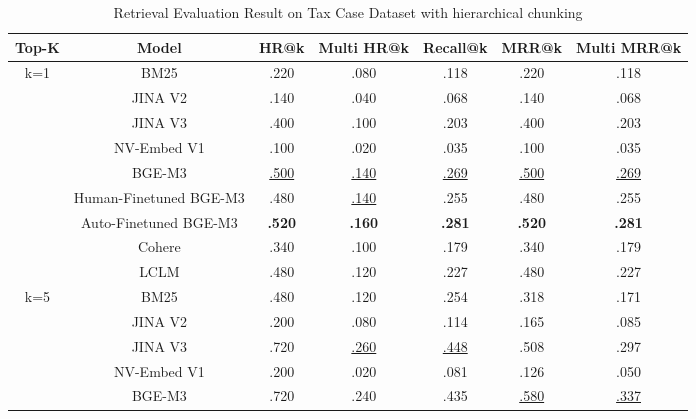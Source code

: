 \begin{table}[ht]
\centering
\caption{Retrieval Evaluation Result on Tax Case Dataset with hierarchical chunking}
\renewcommand{\arraystretch}{1.5} %
\label{table: retrieval_tax}
\begin{tabular}{@{}ccccccc@{}}
\toprule
Top-K & Model                  & HR@k          & Multi HR@k    & Recall@k      & MRR@k         & Multi MRR@k   \\ \midrule
k=1   & BM25                   & .220          & .080          & .118          & .220          & .118          \\
      & JINA V2                & .140          & .040          & .068          & .140          & .068          \\
      & JINA V3                & .400          & .100          & .203          & .400          & .203          \\
      & NV-Embed V1            & .100          & .020          & .035          & .100          & .035          \\
      & BGE-M3                 & \underline{.500}    & \underline{.140}    & \underline{.269}    & \underline{.500}    & \underline{.269}    \\
      & Human-Finetuned BGE-M3 & .480          & \underline{.140}    & .255          & .480          & .255          \\
      & Auto-Finetuned BGE-M3  & \textbf{.520} & \textbf{.160} & \textbf{.281} & \textbf{.520} & \textbf{.281} \\
      & Cohere                 & .340          & .100          & .179          & .340          & .179          \\
      & LCLM                   & .480          & .120          & .227          & .480          & .227          \\ \midrule
k=5   & BM25                   & .480          & .120          & .254          & .318          & .171          \\
      & JINA V2                & .200          & .080          & .114          & .165          & .085          \\
      & JINA V3                & .720          & \underline{.260}    & \underline{.448}    & .508          & .297          \\
      & NV-Embed V1            & .200          & .020          & .081          & .126          & .050          \\
      & BGE-M3                 & .720          & .240          & .435          & \underline{.580}    & \underline{.337}    \\

\end{tabular}
\end{table}
